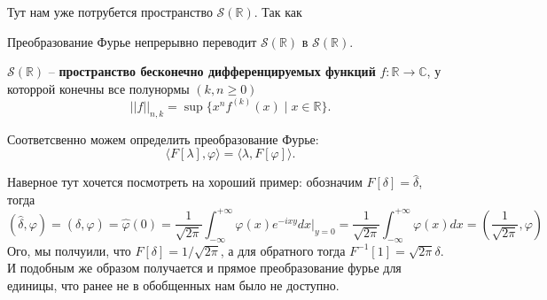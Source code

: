 Тут нам уже потрубется пространство $\mathcal{S}(\mathbb{R})$. Так как
\begin{to_def}
	Преобразование Фурье непрерывно переводит $\mathcal{S}(\mathbb{R})$ в $\mathcal{S}(\mathbb{R})$.
\end{to_def}

\begin{to_def}
	$\mathcal{S}(\mathbb{R})$ -- \textbf{пространство бесконечно дифференцируемых функций} $f \colon \mathbb{R} \to \mathbb{C}$, у которрой конечны все полунормы $(k,n \geq 0)$
	\begin{equation*}
		||f||_{n,k} = \sup \{x^n f^{(k)}(x) \mid x \in \mathbb{R}\}.
	\end{equation*}
\end{to_def}

Соответсвенно можем определить преобразование Фурье:
\begin{equation*}
	\langle F[\lambda], \varphi\rangle = \langle \lambda, F[\varphi]\rangle.
\end{equation*}

Наверное тут хочется посмотреть на хороший пример: обозначим $F[\delta] = \hat{\delta}$, тогда
\begin{equation*}
	(\hat{\delta}, \varphi) = (\delta, \hat{\varphi}) = \hat{\varphi}(0) = \frac{1}{\sqrt{2 \pi}} \int_{-\infty}^{+\infty} \varphi(x) e^{- i x y} d x\big|_{y=0} = \frac{1}{\sqrt{2 \pi}} \int_{-\infty}^{+\infty} \varphi(x) d x = \left(\frac{1}{\sqrt{2 \pi}}, \varphi\right)
\end{equation*}
Ого, мы полчуили, что $F[\delta] = 1/\sqrt{2\pi}$, а для обратного тогда $F^{-1}[1] = \sqrt{2\pi}\delta$. И подобным же образом получается и прямое преобразование фурье для единицы, что ранее не в обобщенных нам было не доступно.
